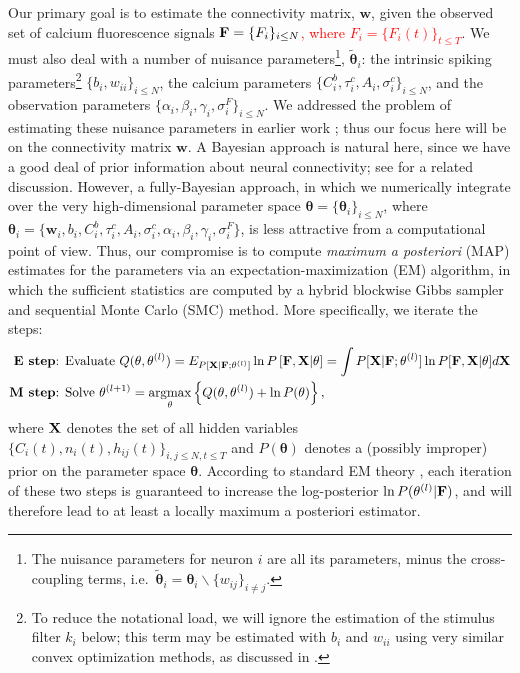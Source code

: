 \documentclass[aoas,preprint]{imsart}
\providecommand{\tr}[1]{\textcolor{red}{#1}}
\newcommand{\bth}{\mathbf{\theta}}
\newcommand{\w}{w}
\newcommand{\bw}{\mathbf{\w}}
\DeclareMathOperator*{\argmax}{argmax}
\newcommand{\bF}{{\bf F}}
\newcommand{\bX}{{\bf X}}
\newcommand{\tbth}{\tilde{\bth}}
\begin{document}
Our primary goal is to estimate the connectivity matrix, $\bw$, given
the observed set of calcium fluorescence signals \tr{$\bF=\{F_i\}_{i\leq N}$, where $F_i=\{F_i(t)\}_{t\leq T}$}. We must also deal with a number of nuisance
parameters\footnote{The nuisance parameters for neuron $i$ are all its
parameters, minus the cross-coupling terms, i.e.\ $\tbth_i =\bth_i
\backslash \{w_{ij}\}_{i\neq j}$.}, $\tbth_i$: the intrinsic spiking
parameters\footnote{To reduce the notational load, we will ignore the
estimation of the stimulus filter $k_i$ below; this term may be
estimated with $b_i$ and $w_{ii}$ using very similar convex
optimization methods, as discussed in \cite{Vogelstein2009}.}  $\{b_i,
w_{ii}\}_{i\leq N}$, the calcium parameters $\{C^b_i, \tau^c_i, A_i,
\sigma^c_i\}_{i\leq N}$, and the observation parameters $\{\alpha_i,
\beta_i, \gamma_i, \sigma^F_i\}_{i\leq N}$. We addressed the problem
of estimating these nuisance parameters in earlier work
\cite{Vogelstein2009}; thus our focus here will be on the connectivity
matrix $\bw$. A Bayesian approach is natural here, since we have a
good deal of prior information about neural connectivity; see
\cite{Rigat06} for a related discussion. However, a fully-Bayesian
approach, in which we numerically integrate over the very
high-dimensional parameter space $\bth= \{\bth_i\}_{i\leq N}$, where
$\bth_i=\{\bw_i, b_i, C^b_i, \tau^c_i, A_i, \sigma^c_i, \alpha_i,
\beta_i, \gamma_i, \sigma^F_i\}$, is less attractive from a
computational point of view. Thus, our compromise is to compute
\emph{maximum a posteriori} (MAP) estimates for the parameters via an
expectation-maximization (EM) algorithm, in which the sufficient
statistics are computed by a hybrid blockwise Gibbs sampler and
sequential Monte Carlo (SMC) method. More specifically, we iterate the
steps:
\begin{align*}
\textbf{E step} &\text{: Evaluate } Q(\bth,\bth^{(l)}) = E_{P[\bX |
\bF; \bth^{(l)}]} \ln P \left[ \bF, \bX | \bth \right] = \int P[\bX |
\bF; \bth^{(l)}] \ln P[\bF, \bX | \bth] d \bX \\ \textbf{M step}
&\text{: Solve } \bth^{(l+1)} = \argmax_{\bth} \left\{
Q(\bth,\bth^{(l)}) + \ln P(\bth) \right\},
\end{align*}
where $\bX$ denotes the set of all hidden variables $\{ C_i(t), n_i(t), h_{ij}(t) \}_{i,j \leq N, t \leq T}$ and $P(\bth)$ denotes a (possibly improper) prior on the parameter space $\bth$. According to standard EM theory \cite{DLR77,McLachlanKrishnan96}, each iteration of these two steps is guaranteed to increase the log-posterior $\ln P(\bth^{(l)} | \bF)$, and will therefore lead to at least a locally maximum a posteriori estimator.
\end{document}
